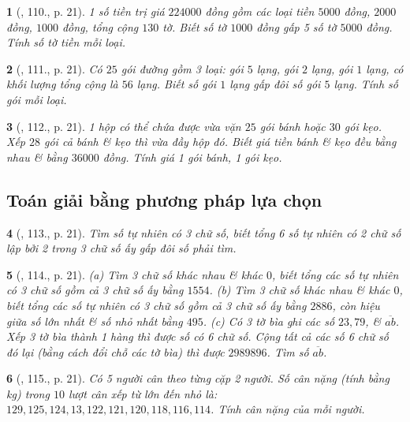 \documentclass{article}
\newtheorem{baitoan}{}
\begin{document}
\begin{baitoan}[\cite{Binh_Toan_6_tap_1}, 110., p. 21]
	1 số tiền trị giá $224000$ đồng gồm các loại tiền $5000$ đồng, $2000$ đồng, $1000$ đồng, tổng cộng $130$ tờ. Biết số tờ $1000$ đồng gấp 5 số tờ $5000$ đồng. Tính số tờ tiền mỗi loại.
\end{baitoan}

\begin{baitoan}[\cite{Binh_Toan_6_tap_1}, 111., p. 21]
	Có $25$ gói đường gồm 3 loại: gói $5$ lạng, gói $2$ lạng, gói $1$ lạng, có khối lượng tổng cộng là $56$ lạng. Biết số gói $1$ lạng gấp đôi số gói $5$ lạng. Tính số gói mỗi loại.
\end{baitoan}

\begin{baitoan}[\cite{Binh_Toan_6_tap_1}, 112., p. 21]
	1 hộp có thể chứa được vừa vặn $25$ gói bánh hoặc $30$ gói kẹo. Xếp $28$ gói cả bánh \& kẹo thì vừa đầy hộp đó. Biết giá tiền bánh \& kẹo đều bằng nhau \& bằng $36000$ đồng. Tính giá 1 gói bánh, 1 gói kẹo.
\end{baitoan}

\subsection{Toán giải bằng phương pháp lựa chọn}

\begin{baitoan}[\cite{Binh_Toan_6_tap_1}, 113., p. 21]
	Tìm số tự nhiên có 3 chữ số, biết tổng 6 số tự nhiên có 2 chữ số lập bởi 2 trong 3 chữ số ấy gấp đôi số phải tìm.
\end{baitoan}

\begin{baitoan}[\cite{Binh_Toan_6_tap_1}, 114., p. 21]
	(a) Tìm 3 chữ số khác nhau \& khác $0$, biết tổng các số tự nhiên có 3 chữ số gồm cả 3 chữ số ấy bằng $1554$. (b) Tìm 3 chữ số khác nhau \& khác $0$, biết tổng các số tự nhiên có 3 chữ số gồm cả 3 chữ số ấy bằng $2886$, còn hiệu giữa số lớn nhất \& số nhỏ nhất bằng $495$. (c) Có 3 tờ bìa ghi các số $23,79$, \& $\overline{ab}$. Xếp 3 tờ bìa thành 1 hàng thì được số có 6 chữ số. Cộng tất cả các số 6 chữ số đó lại (bằng cách đổi chỗ các tờ bìa) thì được $2989896$. Tìm số $\overline{ab}$.
\end{baitoan}

\begin{baitoan}[\cite{Binh_Toan_6_tap_1}, 115., p. 21]
	Có 5 người cân theo từng cặp 2 người. Số cân nặng (tính bằng {\rm kg}) trong $10$ lượt cân xếp từ lớn đến nhỏ là: $129,125,124,13,122,121,120,118,116,114$. Tính cân nặng của mỗi người.
\end{baitoan}
\end{document}
